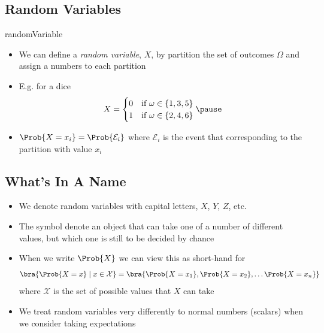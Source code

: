 
\begin{slide}
\section{Random Variables}

\begin{PauseHighLight}
  \begin{rightImage}{randomVariable}
    \begin{itemize}
    \item We can define a \emph{random variable}, $X$, by partition the
      set of outcomes $\Omega$ and assign a numbers to each
      partition\pause
    \item E.g. for a dice
      \begin{align*}
        X =
        \begin{cases}
          0 & \text{if $\omega\in\{1,3,5\}$}\\
          1 & \text{if $\omega\in\{2,4,6\}$}
        \end{cases}\pause
      \end{align*}
    \item $\Prob{X=x_i} = \Prob{\mathcal{E}_i}$ where $\mathcal{E}_i$ is
      the event that corresponding to the partition with value
      $x_i$\pause
    \end{itemize}
  \end{rightImage}
\end{PauseHighLight}

\end{slide}


\begin{slide}
\section{What's In A Name}

\begin{PauseHighLight}
  \begin{itemize}
  \item We denote random variables with capital letters, $X$,
    $Y$, $Z$, etc.\pause
  \item The symbol denote an object that can take one of a number of
    different values, but which one is still to be decided by
    chance\pause
  \item When we write $\Prob{X}$ we can view this as short-hand for
    \begin{align*}
      \bra{\Prob{X=x} \mid x \in \mathcal{X}}
      = \bra{\Prob{X=x_1}, \Prob{X=x_2},\ldots\Prob{X=x_n}}
    \end{align*}
    where $\mathcal{X}$ is the set of possible values that $X$
    can take\pause
  \item We treat random variables very differently to normal numbers
    (scalars) when we consider taking expectations\pause
  \end{itemize}
\end{PauseHighLight}

\end{slide}


